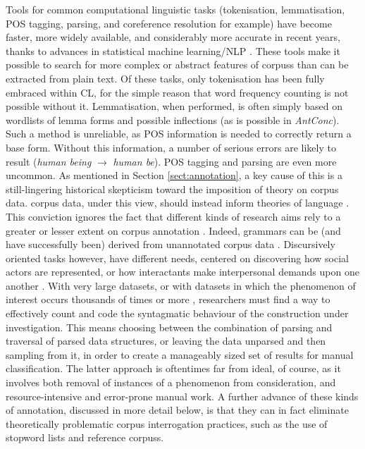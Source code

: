 Tools for common computational linguistic tasks (tokenisation, lemmatisation, \gls{POS} tagging, parsing, and coreference resolution for example) have become faster, more widely available, and considerably more accurate in recent years, thanks to advances in statistical machine learning\slash \gls{NLP} \cite{manning1999foundations}. These tools make it possible to search for more complex or abstract features of \glspl{corpus} than can be extracted from plain text. Of these tasks, only tokenisation has been fully embraced within \gls{CL}, for the simple reason that word frequency counting is not possible without it. Lemmatisation, when performed, is often simply based on wordlists of lemma forms and possible inflections (as is possible in \emph{AntConc}). Such a method is unreliable, as \gls{POS} information is needed to correctly return a base form. Without this information, a number of serious errors are likely to result (\emph{human being} $\rightarrow$ \emph{human be}). \gls{POS} tagging and parsing are even more uncommon. As mentioned in Section \ref{sect:annotation}, a key cause of this is a still\hyp{}lingering historical skepticism toward the imposition of theory on \gls{corpus} data. \Gls{corpus} data, under this view, should instead inform theories of language \cite[e.g.][]{sinclair_trust_2004}. This conviction ignores the fact that different kinds of research aims rely to a greater or lesser extent on \gls{corpus} annotation \cite{anthony_critical_2013}. Indeed, grammars can be (and have successfully been) derived from unannotated \gls{corpus} data \cite[e.g.][]{hunston_pattern_2000}. Discursively oriented tasks however, have different needs, centered on discovering how social actors are represented, or how interactants make interpersonal demands upon one another \cite{gee_introduction_2013}. With very large datasets, or with datasets in which the phenomenon of interest occurs thousands of times or more \cite{zinn_changing_2015}, researchers must find a way to effectively count and code the syntagmatic behaviour of the construction under investigation. This means choosing between the combination of parsing and traversal of parsed data structures, or leaving the data unparsed and then sampling from it, in order to create a manageably sized set of results for manual classification. The latter approach is oftentimes far from ideal, of course, as it involves both removal of instances of a phenomenon from consideration, and resource\hyp{}intensive and error\hyp{}prone manual work. A further advance of these kinds of annotation, discussed in more detail below, is that they can in fact eliminate theoretically problematic \gls{corpus} interrogation practices, such as the use of stopword lists and reference \glspl{corpus}.


